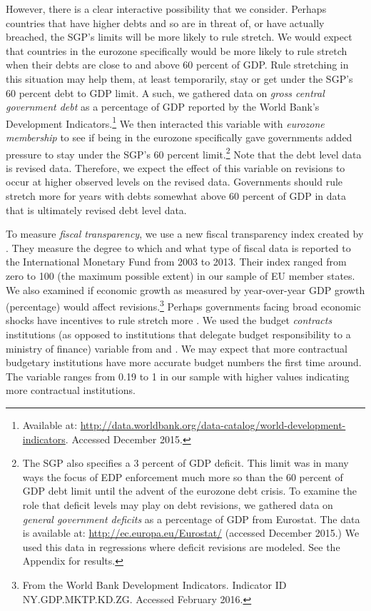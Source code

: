 \documentclass[]{article}
\begin{document}
However, there is a clear interactive possibility that we consider. Perhaps countries that have higher debts and so are in threat of, or have actually breached, the SGP's limits will be more likely to rule stretch. We would expect that countries in the eurozone specifically would be more likely to rule stretch when their debts are close to and above 60 percent of GDP. Rule stretching in this situation may help them, at least temporarily, stay or get under the SGP's 60 percent debt to GDP limit. A such, we gathered data on \emph{gross central government debt} as a percentage of GDP reported by the World Bank's Development Indicators.\footnote{Available at: \url{http://data.worldbank.org/data-catalog/world-development-indicators}. Accessed December 2015.} We then interacted this variable with \emph{eurozone membership} to see if being in the eurozone specifically gave governments added pressure to stay under the SGP's 60 percent limit.\footnote{The SGP also specifies a 3 percent of GDP deficit. This limit was in many ways the focus of EDP enforcement much more so than the 60 percent of GDP debt limit until the advent of the eurozone debt crisis. To examine the role that deficit levels may play on debt revisions, we gathered data on \emph{general government deficits} as a percentage of GDP from Eurostat. The data is available at: \url{http://ec.europa.eu/Eurostat/} (accessed December 2015.) We used this data in regressions where deficit revisions are modeled. See the Appendix for results.} Note that the debt level data is revised data. Therefore, we expect the effect of this variable on revisions to occur at higher observed levels on the revised data. Governments should rule stretch more for years with debts somewhat above 60 percent of GDP in data that is ultimately revised debt level data.

To measure \emph{fiscal transparency}, we use a new fiscal transparency index created by \cite{Wang2015}. They measure the degree to which and what type of fiscal data is reported to the International Monetary Fund from 2003 to 2013. Their index ranged from zero to 100 (the maximum possible extent) in our sample of EU member states. We also examined if economic growth as measured by year-over-year GDP growth (percentage) would affect revisions.\footnote{From the World Bank Development Indicators. Indicator ID NY.GDP.MKTP.KD.ZG. Accessed February 2016.} Perhaps governments facing broad economic shocks have incentives to rule stretch more \citep{DeCastro2013}. We used the budget \emph{contracts} institutions (as opposed to institutions that delegate budget responsibility to a ministry of finance) variable from \cite{hallerberg2007design} and \cite{hallerbergstrauch2009}. We may expect that more contractual budgetary institutions have more accurate budget numbers the first time around. The variable ranges from 0.19 to 1 in our sample with higher values indicating more contractual institutions. 
\end{document}
